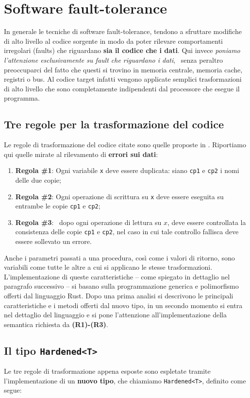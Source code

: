\section{Software fault-tolerance} \label{sec:hardened}
In generale le tecniche di software fault-tolerance, tendono a sfruttare modifiche di alto livello al codice sorgente in modo da poter rilevare comportamenti irregolari (faults) che riguardano \textbf{sia il codice che i dati}. Qui invece \textit{poniamo l’attenzione esclusivamente su fault che riguardano i dati},  senza peraltro preoccuparci del fatto che questi si trovino in memoria centrale, memoria cache, registri o bus. Al codice target infatti vengono applicate semplici trasformazioni di alto livello che sono completamente indipendenti dal processore che esegue il programma. 
\subsection{Tre regole per la trasformazione del codice}
Le regole di trasformazione del codice citate sono quelle proposte in \cite{802887}. Riportiamo qui quelle mirate al rilevamento di \textbf{errori sui dati}:
\begin{enumerate}
    \itemsep-0.2em
    \item \textbf{Regola \#1}: Ogni variabile \texttt{x} deve essere duplicata: siano \texttt{cp1} e \texttt{cp2} i nomi delle due copie;
    \item \textbf{Regola \#2}: Ogni operazione di scrittura su \texttt{x} deve essere eseguita su entrambe le copie \texttt{cp1} e \texttt{cp2};
    \item \textbf{Regola \#3}:  dopo ogni operazione di lettura su $x$, deve essere controllata la consistenza delle copie \texttt{cp1} e \texttt{cp2}, nel caso in cui tale controllo fallisca deve essere sollevato un errore.
\end{enumerate}
Anche i parametri passati a una procedura, così come i valori di ritorno, sono variabili come tutte le altre a cui si applicano le stesse trasformazioni. L'implementazione di queste caratteristiche -- come spiegato in dettaglio nel paragrafo successivo -- si basano sulla programmazione generica e polimorfismo offerti dal linguaggio Rust. Dopo una prima analisi si descrivono le principali caratteristiche e i metodi offerti dal nuovo tipo, in un secondo momento si entra nel dettaglio del linguaggio e si pone l'attenzione all'implementazione della semantica richiesta da \textbf{(R1)-(R3)}.

\subsection{Il tipo \texttt{Hardened<T>}}
Le tre regole di trasformazione appena esposte sono espletate tramite l'implementazione di un \textbf{nuovo tipo}, che chiamiamo \texttt{Hardened<T>}, definito come segue: 

